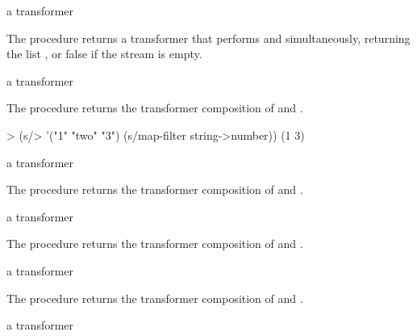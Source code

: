 \begin{procedure}
\end{procedure}
\returns{} a transformer

The  procedure returns a transformer that performs 
and  simultaneously, returning the list , or
false if the stream is empty.

\begin{procedure}
\end{procedure}
\returns{} a transformer

The  procedure returns the transformer composition of  and .

\codebegin
> (s/> '("1" "two" "3") (s/map-filter string->number))
(1 3)
\codeend

\begin{procedure}
\end{procedure}
\returns{} a transformer

The  procedure returns the transformer composition of  and .

\begin{procedure}
\end{procedure}
\returns{} a transformer

The  procedure returns the transformer composition of  and .

\begin{procedure}
\end{procedure}
\returns{} a transformer

The  procedure returns the transformer composition of  and .

\begin{procedure}
\end{procedure}
\returns{} a transformer

